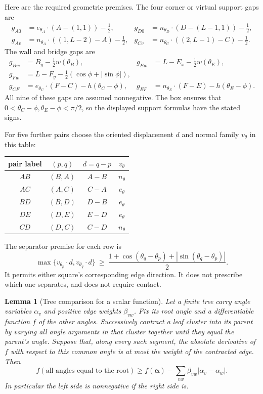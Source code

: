 \documentclass[11pt]{article}
\newtheorem{lemma}[theorem]{Lemma}
\begin{document}
Here are the required geometric premises. The four corner or virtual
support gaps are
\[
\begin{aligned}
 g_{A0}&=e_{\theta_A}\cdot(A-(1,1))-\tfrac12,&
 g_{D0}&=n_{\theta_D}\cdot(D-(L-1,1))-\tfrac12,\\
 g_{Av}&=n_{\theta_A}\cdot((1,L-2)-A)-\tfrac12,&
 g_{Cv}&=n_{\theta_C}\cdot((2,L-1)-C)-\tfrac12.
\end{aligned}
\]
The wall and bridge gaps are
\[
\begin{aligned}
 g_{Bw}&=B_y-\tfrac12w(\theta_B),&
 g_{Ew}&=L-E_x-\tfrac12w(\theta_E),\\
 g_{Fw}&=L-F_y-\tfrac12(\cos\phi+|\sin\phi|),\\
 g_{CF}&=e_{\theta_C}\cdot(F-C)-h(\theta_C-\phi),&
 g_{EF}&=n_{\theta_E}\cdot(F-E)-h(\theta_E-\phi).
\end{aligned}
\]
All nine of these gaps are assumed nonnegative. The box ensures that
$0<\theta_C-\phi,\theta_E-\phi<\pi/2$, so the displayed support
formulas have the stated signs.

For five further pairs choose the oriented displacement $d$ and normal
family $v_\theta$ in this table:
\begin{center}
\begin{tabular}{c|c|c|c}
pair label&$(p,q)$&$d=q-p$&$v_\theta$\\ \hline
$AB$&$(B,A)$&$A-B$&$n_\theta$\\
$AC$&$(A,C)$&$C-A$&$e_\theta$\\
$BD$&$(B,D)$&$D-B$&$e_\theta$\\
$DE$&$(D,E)$&$E-D$&$e_\theta$\\
$CD$&$(D,C)$&$C-D$&$n_\theta$
\end{tabular}
\end{center}
The separator premise for each row is
\begin{equation}
 \max\{v_{\theta_p}\cdot d,v_{\theta_q}\cdot d\}
 \ \ge\ \frac{1+\cos(\theta_q-\theta_p)
                       +|\sin(\theta_q-\theta_p)|}{2}.
 \label{eq:mixed-family-premise}
\end{equation}
It permits either square's corresponding edge direction. It does not
prescribe which one separates, and does not require contact.

\begin{lemma}[Tree comparison for a scalar function]
\label{lem:mixed-tree}
Let a finite tree carry angle variables $\alpha_v$ and positive edge
weights $\beta_{vw}$. Fix its root angle and a differentiable function
$f$ of the other angles. Successively contract a leaf cluster into its
parent by varying all angle arguments in that cluster together until
they equal the parent's angle. Suppose that, along every such segment,
the absolute derivative of $f$ with respect to this common angle is
at most the weight of the contracted edge. Then
\[
 f(\text{all angles equal to the root})
 \ge f(\boldsymbol\alpha)-
       \sum_{vw}\beta_{vw}|\alpha_v-\alpha_w|.
\]
In particular the left side is nonnegative if the right side is.
\end{lemma}
\end{document}
